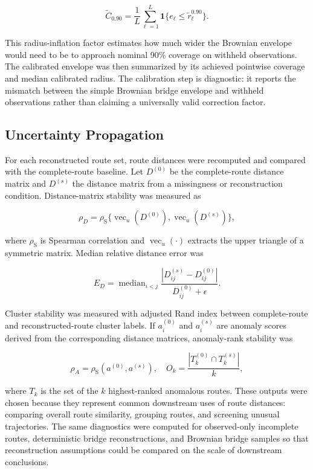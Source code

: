 \[
\tilde C_{0.90}
= \frac{1}{L}\sum_{\ell=1}^{L}
\mathbf{1}\{e_\ell \le \tilde r_\ell^{0.90}\}.
\]

This radius-inflation factor estimates how much wider the Brownian envelope would need to be to approach nominal 90\% coverage on withheld observations. The calibrated envelope was then summarized by its achieved pointwise coverage and median calibrated radius. The calibration step is diagnostic: it reports the mismatch between the simple Brownian bridge envelope and withheld observations rather than claiming a universally valid correction factor.

\subsection{Uncertainty Propagation}\label{uncertainty-propagation-methods}

For each reconstructed route set, route distances were recomputed and compared with the complete-route baseline. Let \(D^{(0)}\) be the complete-route distance matrix and \(D^{(s)}\) the distance matrix from a missingness or reconstruction condition. Distance-matrix stability was measured as

\[
\rho_D = \rho_{\mathrm{S}}\{\operatorname{vec}_u(D^{(0)}),
\operatorname{vec}_u(D^{(s)})\},
\]

where \(\rho_{\mathrm{S}}\) is Spearman correlation and \(\operatorname{vec}_u(\cdot)\) extracts the upper triangle of a symmetric matrix. Median relative distance error was

\[
E_D =
\operatorname{median}_{i<j}
\frac{|D^{(s)}_{ij}-D^{(0)}_{ij}|}{D^{(0)}_{ij}+\epsilon}.
\]

Cluster stability was measured with adjusted Rand index between complete-route and reconstructed-route cluster labels. If \(a_i^{(0)}\) and \(a_i^{(s)}\) are anomaly scores derived from the corresponding distance matrices, anomaly-rank stability was

\[
\rho_A = \rho_{\mathrm{S}}(a^{(0)},a^{(s)}),
\quad
O_k = \frac{|T_k^{(0)}\cap T_k^{(s)}|}{k},
\]

where \(T_k\) is the set of the \(k\) highest-ranked anomalous routes. These outputs were chosen because they represent common downstream uses of route distances: comparing overall route similarity, grouping routes, and screening unusual trajectories. The same diagnostics were computed for observed-only incomplete routes, deterministic bridge reconstructions, and Brownian bridge samples so that reconstruction assumptions could be compared on the scale of downstream conclusions.

